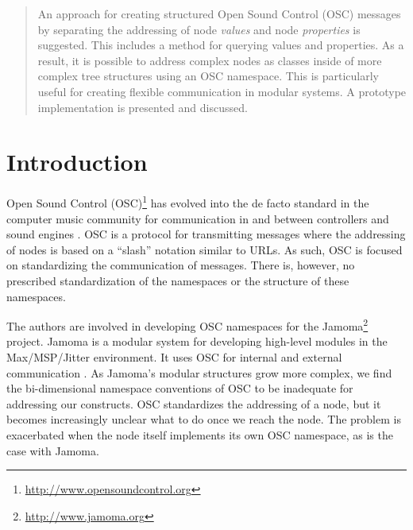 \documentclass{NIME-alternate}
\begin{document}


\begin{abstract}

An approach for creating structured Open Sound Control (OSC) messages by separating the addressing of node \emph{values} and node \emph{properties} is suggested. This includes a method for querying values and properties. As a result, it is possible to address complex nodes as classes inside of more complex tree structures using an OSC namespace. This is particularly useful for creating flexible communication in modular systems.  A prototype implementation is presented and discussed.

\end{abstract}




\section{Introduction} %
\label{sec:introduction}

Open Sound Control (OSC)\footnote{\url{http://www.opensoundcontrol.org}} has evolved into the de facto standard in the computer music community for communication in and between controllers and sound engines \cite{Wright:2003}. OSC is a protocol for transmitting messages where the addressing of nodes is based on a ``slash'' notation similar to URLs. As such, OSC is focused on standardizing the communication of messages. There is, however, no prescribed standardization of the namespaces or the structure of these namespaces. 

The authors are involved in developing OSC namespaces for the Jamoma\footnote{\url{http://www.jamoma.org}} project. Jamoma is a modular system for developing high-level modules in the Max/MSP/Jitter environment. It uses OSC for internal and external communication \cite{Place:2006}.  As Jamoma's modular structures grow more complex, we find the bi-dimensional namespace conventions of OSC to be inadequate for addressing our constructs.  OSC standardizes the addressing of a node, but it becomes increasingly unclear what to do once we reach the node.  The problem is exacerbated when the node itself implements its own OSC namespace, as is the case with Jamoma.
\end{document}
